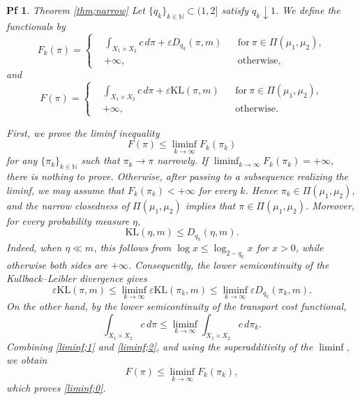 \documentclass[10pt,a4paper]{amsart}
\newtheorem{pf}{Pf}
\newcommand{\N}{\mathbb N}
\newcommand{\ep}{\varepsilon}
\begin{document}
\begin{pf}{Theorem \ref{thm;narrow}}
Let $\{q_k\}_{k \in \N} \subset (1,2]$ satisfy $q_k\downarrow1$. We define the functionals by
\begin{equation*}
F_k(\pi) = \left\{
\begin{aligned} &\int_{X_1 \times X_2} c\, d\pi + \ep D_{q_k}(\pi, m)
&& \mathrm{for}\ \pi \in \Pi(\mu_1, \mu_2), \\
&+ \infty, && \mathrm{otherwise},
\end{aligned}
\right.
\end{equation*}
and
\begin{equation*}
F(\pi) = \left\{
\begin{aligned}
&\int_{X_1 \times X_2} c\, d\pi + \ep \mathrm{KL}(\pi, m)
&& \mathrm{for}\ \pi \in \Pi(\mu_1, \mu_2), \\
&+ \infty, && \mathrm{otherwise}.
\end{aligned}
\right.
\end{equation*}

First, we prove the liminf inequality
\begin{equation}\label{liminf;0}
  F(\pi)
  \leq \liminf_{k \to \infty} F_k(\pi_k)
\end{equation}
for any $\{\pi_k\}_{k \in \N}$ such that $\pi_k \to \pi$ narrowly. If $\displaystyle \liminf_{k\to\infty}F_k(\pi_k)=+\infty$, there is nothing to prove. Otherwise, after passing to a subsequence realizing the liminf, we may assume that $F_k(\pi_k)<+\infty$ for every $k$. Hence $\pi_k\in\Pi(\mu_1,\mu_2)$, and the narrow closedness of $\Pi(\mu_1,\mu_2)$ implies that $\pi\in\Pi(\mu_1,\mu_2)$. Moreover, for every probability measure $\eta$,
\begin{equation*}
\mathrm{KL}(\eta,m) \leq D_{q_k}(\eta,m).
\end{equation*}
Indeed, when $\eta \ll m$, this follows from $\log x\leq\log_{2-q_k}x$ for $x>0$, while otherwise both sides are $+\infty$. Consequently, the lower semicontinuity of the Kullback--Leibler divergence gives
\begin{equation}\label{liminf;1}
  \ep \mathrm{KL}(\pi, m)
  \leq \liminf_{k \to \infty} \ep \mathrm{KL}(\pi_k, m)
  \leq \liminf_{k \to \infty} \ep D_{q_k}(\pi_k, m).
\end{equation}
On the other hand, by the lower semicontinuity of the transport cost functional,
\begin{equation}\label{liminf;2}
\int_{X_1 \times X_2} c\, d\pi \leq \liminf_{k \to \infty} \int_{X_1 \times X_2} c\, d\pi_k.
\end{equation}
Combining \eqref{liminf;1} and \eqref{liminf;2}, and using the superadditivity of the $\liminf$, we obtain
\begin{equation*}
F(\pi) \leq \liminf_{k\to\infty} F_k(\pi_k),
\end{equation*}
which proves \eqref{liminf;0}.


\end{pf}
\end{document}
